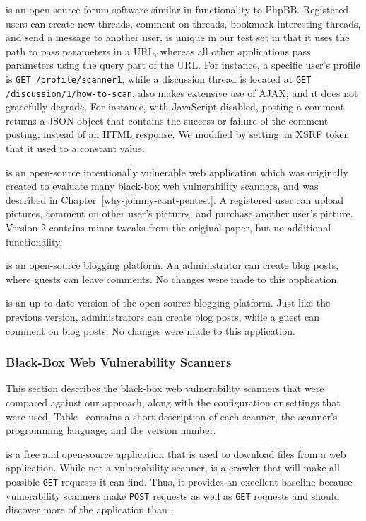 \noindent \textbf{\vanillaforums{}} is an open-source forum software similar in
functionality to PhpBB. Registered users can create new threads, comment on
threads, bookmark interesting threads, and send a message to another user.
\vanillaforums{} is unique in our test set in that it uses the path to pass
parameters in a URL, whereas all other applications pass parameters using the
query part of the URL. For instance, a specific user's profile is \texttt{GET
  /profile/scanner1}, while a discussion thread is located at \texttt{GET
  /discussion/1/how-to-scan}. \vanillaforums{} also makes extensive use of
AJAX, and it does not gracefully degrade. For instance, with
JavaScript disabled, posting a comment returns a JSON object that contains the
success or failure of the comment posting, instead of an HTML response. We
modified \vanillaforums{} by setting an XSRF token that it used to a constant
value.

\noindent \textbf{\wackopicko{}} is an open-source intentionally vulnerable web
application which was originally created to evaluate many black-box web
vulnerability scanners, and was described in Chapter~\ref{why-johnny-cant-pentest}. A registered user can upload
pictures, comment on other user's pictures, and purchase another user's
picture. Version 2 contains minor tweaks from the original paper, but no
additional functionality.

\noindent \textbf{\wordpresstwo{}} is an open-source blogging platform. An
administrator can create blog posts, where guests can leave comments. No
changes were made to this application.

\noindent \textbf{\wordpress{}} is an up-to-date version of the open-source
blogging platform. Just like the previous version, administrators can create
blog posts, while a guest can comment on blog posts. No changes were made to
this application.


\subsubsection{Black-Box Web Vulnerability Scanners}


This section describes the black-box web vulnerability scanners that were
compared against our approach, along with the configuration or settings that
were used. Table~ contains a short description of each scanner,
the scanner's programming language, and the version number.

\noindent \textbf{\wget{}} is a free and open-source application that is used
to download files from a web application. While not a vulnerability scanner,
\wget{} is a crawler that will make all possible \texttt{GET} requests it can
find. Thus, it provides an excellent baseline because vulnerability scanners make
\texttt{POST} requests as well as \texttt{GET} requests and should discover
more of the application than \wget{}.

